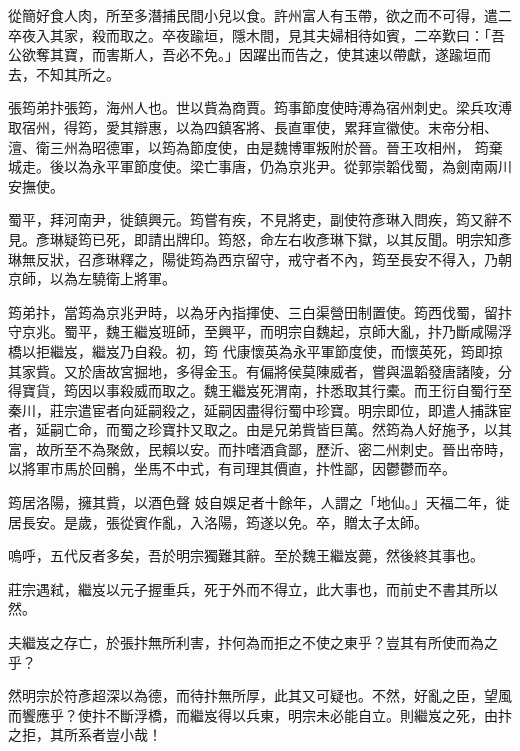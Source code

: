 \begin{pinyinscope}
 從簡好食人肉，所至多潛捕民間小兒以食。許州富人有玉帶，欲之而不可得，遣二卒夜入其家，殺而取之。卒夜踰垣，隱木間，見其夫婦相待如賓，二卒歎曰：「吾公欲奪其寶，而害斯人，吾必不免。」因躍出而告之，使其速以帶獻，遂踰垣而去，不知其所之。



 張筠弟抃張筠，海州人也。世以貲為商賈。筠事節度使時溥為宿州刺史。梁兵攻溥取宿州，得筠，愛其辯惠，以為四鎮客將、長直軍使，累拜宣徽使。末帝分相、澶、衛三州為昭德軍，以筠為節度使，由是魏博軍叛附於晉。晉王攻相州，
 筠棄城走。後以為永平軍節度使。梁亡事唐，仍為京兆尹。從郭崇韜伐蜀，為劍南兩川安撫使。



 蜀平，拜河南尹，徙鎮興元。筠嘗有疾，不見將吏，副使符彥琳入問疾，筠又辭不見。彥琳疑筠已死，即請出牌印。筠怒，命左右收彥琳下獄，以其反聞。明宗知彥琳無反狀，召彥琳釋之，陽徙筠為西京留守，戒守者不內，筠至長安不得入，乃朝京師，以為左驍衛上將軍。



 筠弟抃，當筠為京兆尹時，以為牙內指揮使、三白渠營田制置使。筠西伐蜀，留抃守京兆。蜀平，魏王繼岌班師，至興平，而明宗自魏起，京師大亂，抃乃斷咸陽浮橋以拒繼岌，繼岌乃自殺。初，筠
 代康懷英為永平軍節度使，而懷英死，筠即掠其家貲。又於唐故宮掘地，多得金玉。有偏將侯莫陳威者，嘗與溫韜發唐諸陵，分得寶貨，筠因以事殺威而取之。魏王繼岌死渭南，抃悉取其行橐。而王衍自蜀行至秦川，莊宗遣宦者向延嗣殺之，延嗣因盡得衍蜀中珍寶。明宗即位，即遣人捕誅宦者，延嗣亡命，而蜀之珍寶抃又取之。由是兄弟貲皆巨萬。然筠為人好施予，以其富，故所至不為聚斂，民賴以安。而抃嗜酒貪鄙，歷沂、密二州刺史。晉出帝時，以將軍市馬於回鶻，坐馬不中式，有司理其價直，抃性鄙，因鬱鬱而卒。



 筠居洛陽，擁其貲，以酒色聲
 妓自娛足者十餘年，人謂之「地仙。」天福二年，徙居長安。是歲，張從賓作亂，入洛陽，筠遂以免。卒，贈太子太師。



 嗚呼，五代反者多矣，吾於明宗獨難其辭。至於魏王繼岌薨，然後終其事也。



 莊宗遇弒，繼岌以元子握重兵，死于外而不得立，此大事也，而前史不書其所以然。



 夫繼岌之存亡，於張抃無所利害，抃何為而拒之不使之東乎？豈其有所使而為之乎？



 然明宗於符彥超深以為德，而待抃無所厚，此其又可疑也。不然，好亂之臣，望風而饗應乎？使抃不斷浮橋，而繼岌得以兵東，明宗未必能自立。則繼岌之死，由抃之拒，其所系者豈小哉！




\end{pinyinscope}
